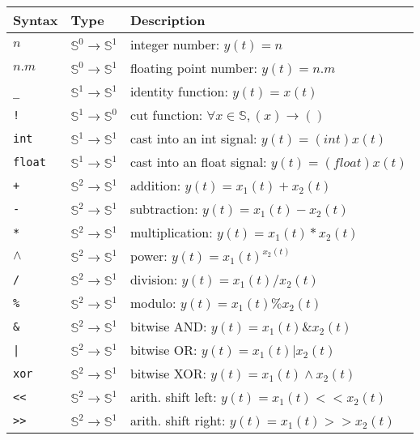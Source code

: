 \begin{tabular}{|l|l|l|}
\hline
\textbf{Syntax} & \textbf{Type}  & \textbf{Description}   \\
\hline
$n$ & $\mathbb{S}^{0}\rightarrow\mathbb{S}^{1}$ & integer number: $y(t)=n$ 			  \\
$n.m$ & $\mathbb{S}^{0}\rightarrow\mathbb{S}^{1}$ & floating point number: $y(t)=n.m$	  \\

\texttt{\_} & $\mathbb{S}^{1}\rightarrow\mathbb{S}^{1}$ & identity function: $y(t)=x(t)$	  \\
\texttt{!} & $\mathbb{S}^{1}\rightarrow\mathbb{S}^{0}$ & cut function: $\forall x\in\mathbb{S},(x)\rightarrow ()$	  \\

\texttt{int} & $\mathbb{S}^{1}\rightarrow\mathbb{S}^{1}$ & cast into an int signal: $y(t)=(int)x(t)$  		  \\
\texttt{float} & $\mathbb{S}^{1}\rightarrow\mathbb{S}^{1}$ & cast into an float signal: $y(t)=(float)x(t)$  	  \\

\texttt{+} & $\mathbb{S}^{2}\rightarrow\mathbb{S}^{1}$ & addition: $y(t)=x_{1}(t)+x_{2}(t)$ 		 \\
\texttt{-} & $\mathbb{S}^{2}\rightarrow\mathbb{S}^{1}$ & subtraction: $y(t)=x_{1}(t)-x_{2}(t)$  		 \\
\texttt{*} & $\mathbb{S}^{2}\rightarrow\mathbb{S}^{1}$ & multiplication: $y(t)=x_{1}(t)*x_{2}(t)$  		 \\
\texttt{$\land$} & $\mathbb{S}^{2}\rightarrow\mathbb{S}^{1}$ & power: $y(t)=x_{1}(t)^{x_{2}(t)}$ 	 \\
\texttt{/} & $\mathbb{S}^{2}\rightarrow\mathbb{S}^{1}$ & division: $y(t)=x_{1}(t)/x_{2}(t)$  			 \\
\texttt{\%} & $\mathbb{S}^{2}\rightarrow\mathbb{S}^{1}$ & modulo: $y(t)=x_{1}(t)\%x_{2}(t)$  		 \\

\texttt{\&} & $\mathbb{S}^{2}\rightarrow\mathbb{S}^{1}$ & bitwise AND: $y(t)=x_{1}(t)\&x_{2}(t)$  		 \\
\texttt{|} & $\mathbb{S}^{2}\rightarrow\mathbb{S}^{1}$ & bitwise OR: $y(t)=x_{1}(t)|x_{2}(t)$  			 \\
\texttt{xor} & $\mathbb{S}^{2}\rightarrow\mathbb{S}^{1}$ & bitwise XOR: $y(t)=x_{1}(t)\land x_{2}(t)$   	 \\

\texttt{<}\texttt{<} & $\mathbb{S}^{2}\rightarrow\mathbb{S}^{1}$ & arith. shift left: $y(t)=x_{1}(t) << x_{2}(t)$   	 \\
\texttt{>}\texttt{>} & $\mathbb{S}^{2}\rightarrow\mathbb{S}^{1}$ & arith. shift right: $y(t)=x_{1}(t) >> x_{2}(t)$  	  \\



\end{tabular}
